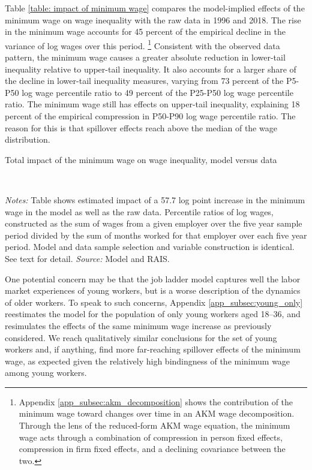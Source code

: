 Table \ref{table: impact of minimum wage} compares the model-implied effects of the minimum wage on wage inequality with the raw data in 1996 and 2018. The rise in the minimum wage accounts for 45 percent of the empirical decline in the variance of log wages over this period.%
%
\footnote{Appendix \ref{app_subsec:akm_decomposition} shows the contribution of the minimum wage toward changes over time in an AKM wage decomposition. Through the lens of the reduced-form AKM wage equation, the minimum wage acts through a combination of compression in person fixed effects, compression in firm fixed effects, and a declining covariance between the two.} %
%
Consistent with the observed data pattern, the minimum wage causes a greater absolute reduction in lower-tail inequality relative to upper-tail inequality. It also accounts for a larger share of the decline in lower-tail inequality measures, varying from 73 percent of the P5-P50 log wage percentile ratio to 49 percent of the P25-P50 log wage percentile ratio. The minimum wage still has effects on upper-tail inequality, explaining 18 percent of the empirical compression in P50-P90 log wage percentile ratio. The reason for this is that spillover effects reach above the median of the wage distribution.

\begin{table}[!htb]
  \begin{small}
  \centering
  \caption{Total impact of the minimum wage on wage inequality, model versus data\label{table: impact of minimum wage}}
  \\
  \posttabvspace
  \begin{minipage}[t]{1\columnwidth}%
    \begin{spacing}{0.75}
      {\scriptsize \textit{Notes:} Table shows estimated impact of a 57.7 log point increase in the minimum wage in the model as well as the raw data. Percentile ratios of log wages, constructed as the sum of wages from a given employer over the five year sample period divided by the sum of months worked for that employer over each five year period. Model and data sample selection and variable construction is identical. See text for detail. %
      \textit{Source:} Model and RAIS.}
    \end{spacing}
  \end{minipage}
  \end{small}
\end{table}

One potential concern may be that the job ladder model captures well the labor market experiences of young workers, but is a worse description of the dynamics of older workers. To speak to such concerns, Appendix \ref{app_subsec:young_only} reestimates the model for the population of only young workers aged 18--36, and resimulates the effects of the same minimum wage increase as previously considered. We reach qualitatively similar conclusions for the set of young workers and, if anything, find more far-reaching spillover effects of the minimum wage, as expected given the relatively high bindingness of the minimum wage among young workers.


